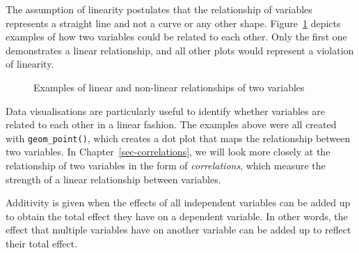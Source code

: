 \documentclass[
  letterpaper,
]{krantz}
\begin{document}
The assumption of linearity postulates that the relationship of
variables represents a straight line and not a curve or any other shape.
Figure~\ref{fig-linear-nonlinear-relationships} depicts examples of how
two variables could be related to each other. Only the first one
demonstrates a linear relationship, and all other plots would represent
a violation of linearity.

\begin{figure}


\caption{\label{fig-linear-nonlinear-relationships}Examples of linear
and non-linear relationships of two variables}

\end{figure}%

Data visualisations are particularly useful to identify whether
variables are related to each other in a linear fashion. The examples
above were all created with \texttt{geom\_point()}, which creates a dot
plot that maps the relationship between two variables. In
Chapter~\ref{sec-correlations}, we will look more closely at the
relationship of two variables in the form of \emph{correlations}, which
measure the strength of a linear relationship between variables.

Additivity is given when the effects of all independent variables can be
added up to obtain the total effect they have on a dependent variable.
In other words, the effect that multiple variables have on another
variable can be added up to reflect their total effect.
\end{document}
